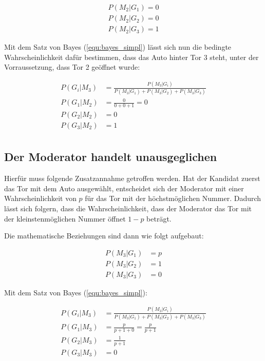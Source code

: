 \begin{align*}
    P(M_2 | G_1) = 0 \\
    P(M_2 | G_2) = 0 \\
    P(M_2 | G_3) = 1
\end{align*}

Mit dem Satz von Bayes (\autoref{equ:bayes_simpl}) lässt sich nun die bedingte Wahrscheinlichkeit dafür bestimmen, dass das Auto hinter Tor 3 steht, unter der Vorraussetzung, dass Tor 2 geöffnet wurde:

\begin{align*}
    P(G_i | M_3) & = \frac{P(M_3 | G_i)}{P(M_3 | G_1) + P(M_3 | G_2) + P(M_3 | G_3)} \\
    P(G_1 | M_2) & = \frac{0}{0+0+1} = 0                                             \\
    P(G_2 | M_2) & = 0                                                               \\
    P(G_3 | M_2) & = 1                                                               \\
\end{align*}


\subsection{Der Moderator handelt unausgeglichen}

Hierfür muss folgende Zusatzannahme getroffen werden. Hat der Kandidat zuerst das Tor mit dem Auto ausgewählt, entscheidet sich der Moderator mit einer Wahrscheinlichkeit von $p$
für das Tor mit der höchstmöglichen Nummer. Dadurch lässt sich folgern, dass die Wahrscheinlichkeit, dass der Moderator das Tor mit der kleinstenmöglichen Nummer öffnet $1 - p$ beträgt.

Die mathematische Beziehungen sind dann wie folgt aufgebaut:

\begin{align*}
    P(M_3 | G_1) & = p \\
    P(M_3 | G_2) & = 1 \\
    P(M_3 | G_3) & = 0
\end{align*}

Mit dem Satz von Bayes (\autoref{equ:bayes_simpl}):

\begin{align*}
    P(G_i | M_3) & = \frac{P(M_3 | G_i)}{P(M_3 | G_1) + P(M_3 | G_2) + P(M_3 | G_3)} \\
    P(G_1 | M_3) & = \frac{p}{p+1+0} = \frac{p}{p+1}                                 \\
    P(G_2 | M_3) & = \frac{1}{p+1}                                                   \\
    P(G_3 | M_3) & = 0                                                               \\
\end{align*}

